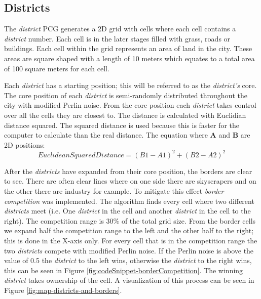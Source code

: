 	\subsection{Districts}
	The \textit{district} PCG generates a 2D grid with cells where each cell contains a \textit{district} number. Each cell is in the later stages filled with grass, roads or buildings. Each cell within the grid represents an area of land in the city. These areas are square shaped with a length of 10 meters which equates to a total area of 100 square meters for each cell.
		
	\par
	Each \textit{district} has a starting position; this will be referred to as the \textit{district's} core. The core position of each \textit{district} is semi-randomly distributed throughout the city with modified Perlin noise. From the core position each \textit{district} takes control over all the cells they are closest to. The distance is calculated with Euclidian distance squared. The squared distance is used because this is faster for the computer to calculate than the real distance. The equation where \textbf{A} and \textbf{B} are 2D positions:
	\begin{equation}
		EuclideanSquaredDistance = (B1 - A1)^2 + (B2 - A2)^2
	\end{equation}
		
	\par
	After the \textit{districts} have expanded from their core position, the borders are clear to see. There are often clear lines where on one side there are skyscrapers and on the other there are industry for example. To mitigate this effect \textit{border competition} was implemented. The algorithm finds every cell where two different \textit{districts} meet (i.e. One \textit{district} in the cell and another \textit{district} in the cell to the right). The competition range is 30\% of the total grid size. From the border cells we expand half the competition range to the left and the other half to the right; this is done in the X-axis only. For every cell that is in the competition range the two \textit{districts} compete with modified Perlin noise. If the Perlin noise is above the value of 0.5 the \textit{district} to the left wins, otherwise the \textit{district} to the right wins, this can be seen in Figure \ref{fig:codeSnippet-borderCompetition}. The winning \textit{district} takes ownership of the cell. A visualization of this process can be seen in Figure \ref{fig:map-districts-and-borders}.
	
